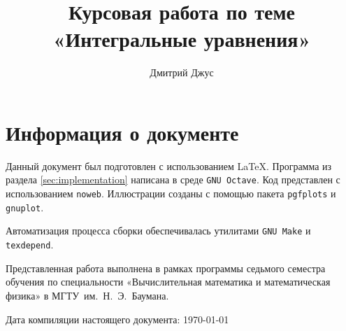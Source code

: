 \documentclass[11pt]{article}
\numberwithin{equation}{section}
\newcommand{\program}[1]{{\tt #1}}
\newcommand{\name}{\textsc}
\begin{document}
\author{Дмитрий Джус}
\title{Курсовая работа по теме \\
  \Huge{«Интегральные уравнения»}}
\pretitle{\begin{center}\LARGE}
  \posttitle{\par\end{center}\vskip 3pc}
\date{}
\maketitle
\thispagestyle{empty}

\clearpage
\tableofcontents

\clearpage



\clearpage
\section{Информация о документе}

Данный документ был подготовлен с использованием \LaTeX{}. Программа
из раздела \ref{sec:implementation} написана в среде
\program{GNU Octave}. Код представлен с использованием
\program{noweb}. Иллюстрации созданы с помощью пакета
\program{pgfplots} и \program{gnuplot}.

Автоматизация процесса сборки обеспечивалась утилитами
\program{GNU Make} и \program{texdepend}.

Представленная работа выполнена в рамках программы седьмого семестра
обучения по специальности «Вычислительная математика и математическая
физика» в МГТУ им. Н. Э. Баумана.


Дата компиляции настоящего документа: \today
\newcommand{\BibEmph}{\name}


\end{document}
